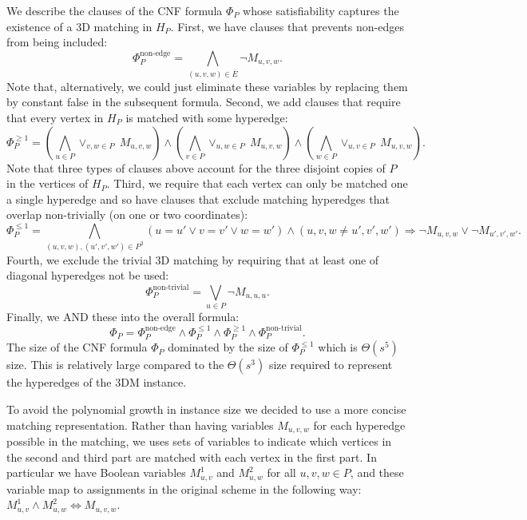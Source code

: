 \documentclass[11pt]{article}
\begin{document}
We describe the clauses of the CNF formula $\Phi_P$ whose
satisfiability captures the existence of a 3D matching in $H_P$.
First, we have clauses that prevents non-edges from being included:
\begin{equation}
  \Phi_P^{\text{non-edge}} = \bigwedge_{(u,v,w) \in \overline{E}} \neg M_{u,v,w}.
\end{equation}
Note that, alternatively, we could just eliminate these variables by
replacing them by constant false in the subsequent formula. Second, we
add clauses that require that every vertex in $H_P$ is matched with
some hyperedge:
\begin{equation}
  \Phi_P^{\ge 1} = 
  \left(\bigwedge_{u \in P}\vee_{v,w \in P} ~M_{u,v,w}\right)
  \wedge \left(\bigwedge_{v \in P}\vee_{u,w \in P} ~M_{u,v,w}\right)
  \wedge \left(\bigwedge_{w \in P}\vee_{u,v \in P} ~M_{u,v,w}\right).
\end{equation}
Note that three types of clauses above account for the three disjoint
copies of $P$ in the vertices of $H_P$.  Third, we require that each
vertex can only be matched one a single hyperedge and so have clauses
that exclude matching hyperedges that overlap non-trivially (on one or
two coordinates):
\begin{equation}
  \Phi_P^{\le 1} = \bigwedge_{(u,v,w), (u',v',w') \in P^3} (u = u'
  \vee v = v' \vee w = w') \wedge (u,v,w \neq u',v',w') \Rightarrow
  \neg M_{u,v,w} \vee \neg M_{u',v',w'}.
\end{equation}
Fourth, we exclude the trivial 3D matching by requiring that at least
one of diagonal hyperedges not be used:
\begin{equation}
  \Phi_P^{\text{non-trivial}} = \bigvee_{u \in P} \neg M_{u,u,u}.
\end{equation}
Finally, we AND these into the overall formula:
\begin{equation}
  \Phi_P = \Phi_P^{\text{non-edge}} \wedge \Phi_P^{\le 1} \wedge
  \Phi_P^{\ge 1} \wedge \Phi_P^{\text{non-trivial}}.
\end{equation}
The size of the CNF formula $\Phi_P$ dominated by the size of
$\Phi_P^{\le 1}$ which is $\Theta(s^5)$ size.  This is relatively
large compared to the $\Theta(s^3)$ size required to represent the
hyperedges of the 3DM instance.

To avoid the polynomial growth in instance size we decided to use a
more concise matching representation.  Rather than having variables
$M_{u,v,w}$ for each hyperedge possible in the matching, we uses sets
of variables to indicate which vertices in the second and third part
are matched with each vertex in the first part.  In particular we have
Boolean variables $M_{u,v}^1$ and $M_{u,w}^2$ for all $u, v, w \in P$,
and these variable map to assignments in the original scheme in the
following way: $M_{u,v}^1 \wedge M_{u,w}^2 \Leftrightarrow M_{u,v,w}$.
\end{document}
